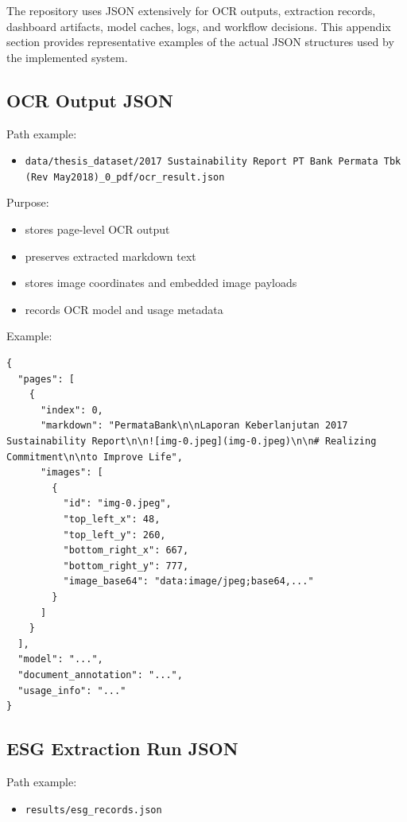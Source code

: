 \documentclass[12pt,a4paper]{report}
\providecommand{\tightlist}{\setlength{\itemsep}{0pt}\setlength{\parskip}{0pt}}
\begin{document}
The repository uses JSON extensively for OCR outputs, extraction records, dashboard artifacts, model caches, logs, and workflow decisions. This appendix section provides representative examples of the actual JSON structures used by the implemented system.

\subsection{OCR Output JSON}\label{ocr-output-json}

Path example:

\begin{itemize}
\tightlist
\item
  \texttt{data/thesis\_dataset/2017\ Sustainability\ Report\ PT\ Bank\ Permata\ Tbk\ (Rev\ May2018)\_0\_pdf/ocr\_result.json}
\end{itemize}

Purpose:

\begin{itemize}
\tightlist
\item
  stores page-level OCR output
\item
  preserves extracted markdown text
\item
  stores image coordinates and embedded image payloads
\item
  records OCR model and usage metadata
\end{itemize}

Example:

\begin{verbatim}
{
  "pages": [
    {
      "index": 0,
      "markdown": "PermataBank\n\nLaporan Keberlanjutan 2017 Sustainability Report\n\n![img-0.jpeg](img-0.jpeg)\n\n# Realizing Commitment\n\nto Improve Life",
      "images": [
        {
          "id": "img-0.jpeg",
          "top_left_x": 48,
          "top_left_y": 260,
          "bottom_right_x": 667,
          "bottom_right_y": 777,
          "image_base64": "data:image/jpeg;base64,..."
        }
      ]
    }
  ],
  "model": "...",
  "document_annotation": "...",
  "usage_info": "..."
}
\end{verbatim}

\subsection{ESG Extraction Run JSON}\label{esg-extraction-run-json}

Path example:

\begin{itemize}
\tightlist
\item
  \texttt{results/esg\_records.json}
\end{itemize}
\end{document}
